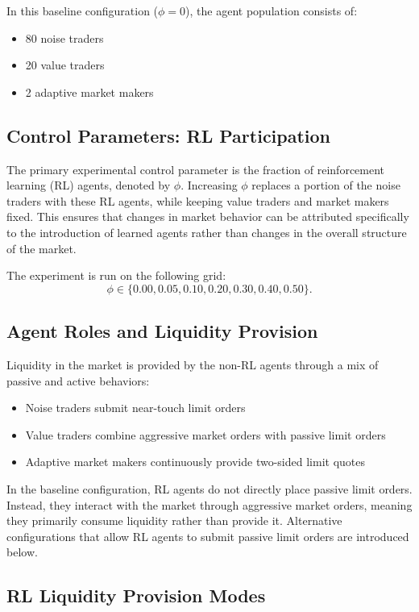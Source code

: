 \documentclass[sigconf]{acmart}
\begin{document}
In this baseline configuration ($\phi = 0$), the agent population consists of:
\begin{itemize}[leftmargin=1.5em]
    \item 80 noise traders
    \item 20 value traders
    \item 2 adaptive market makers
\end{itemize}

\subsection{Control Parameters: RL Participation}

The primary experimental control parameter is the fraction of reinforcement learning (RL) agents, denoted by $\phi$. Increasing $\phi$ replaces a portion of the noise traders with these RL agents, while keeping value traders and market makers fixed. This ensures that changes in market behavior can be attributed specifically to the introduction of learned agents rather than changes in the overall structure of the market.

The experiment is run on the following grid:
\[
\phi \in \{0.00, 0.05, 0.10, 0.20, 0.30, 0.40, 0.50\}.
\]

\subsection{Agent Roles and Liquidity Provision}

Liquidity in the market is provided by the non-RL agents through a mix of passive and active behaviors:
\begin{itemize}[leftmargin=1.5em]
    \item Noise traders submit near-touch limit orders
    \item Value traders combine aggressive market orders with passive limit orders
    \item Adaptive market makers continuously provide two-sided limit quotes
\end{itemize}

In the baseline configuration, RL agents do not directly place passive limit orders. Instead, they interact with the market through aggressive market orders, meaning they primarily consume liquidity rather than provide it. Alternative configurations that allow RL agents to submit passive limit orders are introduced below.

\subsection{RL Liquidity Provision Modes}
\end{document}
